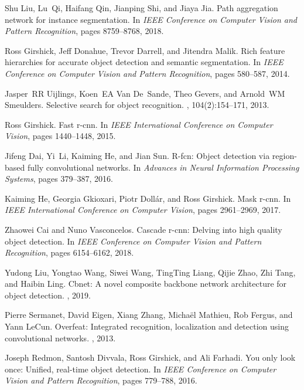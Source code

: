 \documentclass[journal]{IEEEtran}
\begin{document}
\begin{thebibliography}{10}
	Shu Liu, Lu~Qi, Haifang Qin, Jianping Shi, and Jiaya Jia.
	\newblock Path aggregation network for instance segmentation.
	\newblock In {\em IEEE Conference on Computer Vision and Pattern Recognition},
	pages 8759--8768, 2018.
	
	Ross Girshick, Jeff Donahue, Trevor Darrell, and Jitendra Malik.
	\newblock Rich feature hierarchies for accurate object detection and semantic
	segmentation.
	\newblock In {\em IEEE Conference on Computer Vision and Pattern Recognition},
	pages 580--587, 2014.
	
	Jasper~RR Uijlings, Koen~EA Van De~Sande, Theo Gevers, and Arnold~WM Smeulders.
	\newblock Selective search for object recognition.
	, 104(2):154--171,
	2013.
	
	Ross Girshick.
	\newblock Fast r-cnn.
	\newblock In {\em IEEE International Conference on Computer Vision}, pages
	1440--1448, 2015.
	
	Jifeng Dai, Yi~Li, Kaiming He, and Jian Sun.
	\newblock R-fcn: Object detection via region-based fully convolutional
	networks.
	\newblock In {\em Advances in Neural Information Processing Systems}, pages
	379--387, 2016.
	
	Kaiming He, Georgia Gkioxari, Piotr Doll{\'a}r, and Ross Girshick.
	\newblock Mask r-cnn.
	\newblock In {\em IEEE International Conference on Computer Vision}, pages
	2961--2969, 2017.
	
	Zhaowei Cai and Nuno Vasconcelos.
	\newblock Cascade r-cnn: Delving into high quality object detection.
	\newblock In {\em IEEE Conference on Computer Vision and Pattern Recognition},
	pages 6154--6162, 2018.
	
	Yudong Liu, Yongtao Wang, Siwei Wang, TingTing Liang, Qijie Zhao, Zhi Tang, and
	Haibin Ling.
	\newblock Cbnet: A novel composite backbone network architecture for object
	detection.
	, 2019.
	
	Pierre Sermanet, David Eigen, Xiang Zhang, Micha{\"e}l Mathieu, Rob Fergus, and
	Yann LeCun.
	\newblock Overfeat: Integrated recognition, localization and detection using
	convolutional networks.
	, 2013.
	
	Joseph Redmon, Santosh Divvala, Ross Girshick, and Ali Farhadi.
	\newblock You only look once: Unified, real-time object detection.
	\newblock In {\em IEEE Conference on Computer Vision and Pattern Recognition},
	pages 779--788, 2016.
	

\end{thebibliography}
\end{document}
